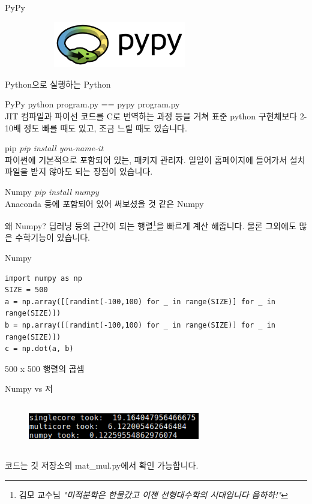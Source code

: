 \documentclass{beamer}
\begin{document}
\begin{frame}{PyPy}
\begin{figure}[H]
  \centering
  \includegraphics[width=80mm,height=20mm]{pypy-logo.png}
\end{figure}
  Python으로 실행하는 Python
\end{frame}

\begin{frame}{PyPy}
  python program.py == pypy program.py\\
  JIT 컴파일과 파이선 코드를 C로 번역하는 과정 등을 거쳐 표준 python 구현체보다
  2-10배 정도 빠를 때도 있고, 조금 느릴 때도 있습니다.
\end{frame}

\begin{frame}{pip}
\textit{pip install you-name-it}\\
  파이썬에 기본적으로 포함되어 있는, 패키지 관리자. 일일이 홈페이지에 들어가서
  설치파일을 받지 않아도 되는 장점이 있습니다.
\end{frame}

\begin{frame}{Numpy}
\textit{pip install numpy}\\
Anaconda 등에 포함되어 있어 써보셨을 것 같은 Numpy\\
\end{frame}

\begin{frame}{왜 Numpy?}
  딥러닝 등의 근간이 되는 행렬\footnote{김모 교수님 \textit{"미적분학은 한물갔고 이젠 선형대수학의
  시대입니다 음하하!"}}을 빠르게 계산 해줍니다.
물론 그외에도 많은 수학기능이 있습니다.
\end{frame}

\begin{frame}[fragile]{Numpy}
\begin{lstlisting}
import numpy as np
SIZE = 500
a = np.array([[randint(-100,100) for _ in range(SIZE)] for _ in range(SIZE)])
b = np.array([[randint(-100,100) for _ in range(SIZE)] for _ in range(SIZE)])
c = np.dot(a, b)
\end{lstlisting}
500 x 500 행렬의 곱셈
\end{frame}

\begin{frame}[fragile]{Numpy vs 저}
\begin{figure}[H]
  \centering
  \includegraphics[width=75mm,height=20mm]{./numpy-result.png}
\end{figure}
코드는 깃 저장소의 mat\_mul.py에서 확인 가능합니다.
\end{frame}
\end{document}
